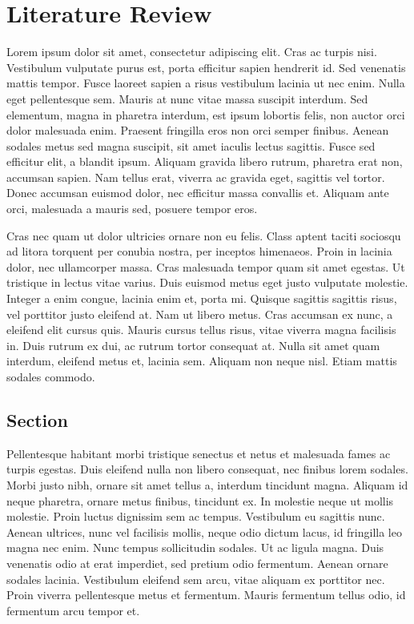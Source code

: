\chapter{Literature Review}
\label{ch:literature_review}

Lorem ipsum dolor sit amet, consectetur adipiscing elit. Cras ac turpis nisi. Vestibulum vulputate purus est, porta efficitur sapien hendrerit id. Sed venenatis mattis tempor. Fusce laoreet sapien a risus vestibulum lacinia ut nec enim. Nulla eget pellentesque sem. Mauris at nunc vitae massa suscipit interdum. Sed elementum, magna in pharetra interdum, est ipsum lobortis felis, non auctor orci dolor malesuada enim. Praesent fringilla eros non orci semper finibus. Aenean sodales metus sed magna suscipit, sit amet iaculis lectus sagittis. Fusce sed efficitur elit, a blandit ipsum. Aliquam gravida libero rutrum, pharetra erat non, accumsan sapien. Nam tellus erat, viverra ac gravida eget, sagittis vel tortor. Donec accumsan euismod dolor, nec efficitur massa convallis et. Aliquam ante orci, malesuada a mauris sed, posuere tempor eros.

Cras nec quam ut dolor ultricies ornare non eu felis. Class aptent taciti sociosqu ad litora torquent per conubia nostra, per inceptos himenaeos. Proin in lacinia dolor, nec ullamcorper massa. Cras malesuada tempor quam sit amet egestas. Ut tristique in lectus vitae varius. Duis euismod metus eget justo vulputate molestie. Integer a enim congue, lacinia enim et, porta mi. Quisque sagittis sagittis risus, vel porttitor justo eleifend at. Nam ut libero metus. Cras accumsan ex nunc, a eleifend elit cursus quis. Mauris cursus tellus risus, vitae viverra magna facilisis in. Duis rutrum ex dui, ac rutrum tortor consequat at. Nulla sit amet quam interdum, eleifend metus et, lacinia sem. Aliquam non neque nisl. Etiam mattis sodales commodo.

\section{Section}
\label{sec:literature_review:sec1}

Pellentesque habitant morbi tristique senectus et netus et malesuada fames ac turpis egestas. Duis eleifend nulla non libero consequat, nec finibus lorem sodales. Morbi justo nibh, ornare sit amet tellus a, interdum tincidunt magna. Aliquam id neque pharetra, ornare metus finibus, tincidunt ex. In molestie neque ut mollis molestie. Proin luctus dignissim sem ac tempus. Vestibulum eu sagittis nunc. Aenean ultrices, nunc vel facilisis mollis, neque odio dictum lacus, id fringilla leo magna nec enim. Nunc tempus sollicitudin sodales. Ut ac ligula magna. Duis venenatis odio at erat imperdiet, sed pretium odio fermentum. Aenean ornare sodales lacinia. Vestibulum eleifend sem arcu, vitae aliquam ex porttitor nec. Proin viverra pellentesque metus et fermentum. Mauris fermentum tellus odio, id fermentum arcu tempor et.


